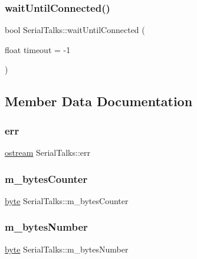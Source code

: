 \subsubsection{\texorpdfstring{wait\+Until\+Connected()}{waitUntilConnected()}}
{\footnotesize\ttfamily bool Serial\+Talks\+::wait\+Until\+Connected (\begin{DoxyParamCaption}\item[{float}]{timeout = {\ttfamily -\/1} }\end{DoxyParamCaption})}



\subsection{Member Data Documentation}
\mbox{\label{class_serial_talks_ad0f3d8029336f8f3e0522c18de8206fd}} 
\subsubsection{\texorpdfstring{err}{err}}
{\footnotesize\ttfamily \hyperlink{classostream}{ostream} Serial\+Talks\+::err}

\mbox{\label{class_serial_talks_ab47d58ef0dcabdde5c0d127c0265df6a}} 
\subsubsection{\texorpdfstring{m\+\_\+bytes\+Counter}{m\_bytesCounter}}
{\footnotesize\ttfamily \hyperlink{serialutils_8h_a0c8186d9b9b7880309c27230bbb5e69d}{byte} Serial\+Talks\+::m\+\_\+bytes\+Counter\hspace{0.3cm}{\ttfamily [protected]}}

\mbox{\label{class_serial_talks_a57d258fa613c6d0af8f8e4b1321f45fc}} 
\subsubsection{\texorpdfstring{m\+\_\+bytes\+Number}{m\_bytesNumber}}
{\footnotesize\ttfamily \hyperlink{serialutils_8h_a0c8186d9b9b7880309c27230bbb5e69d}{byte} Serial\+Talks\+::m\+\_\+bytes\+Number\hspace{0.3cm}{\ttfamily [protected]}}

